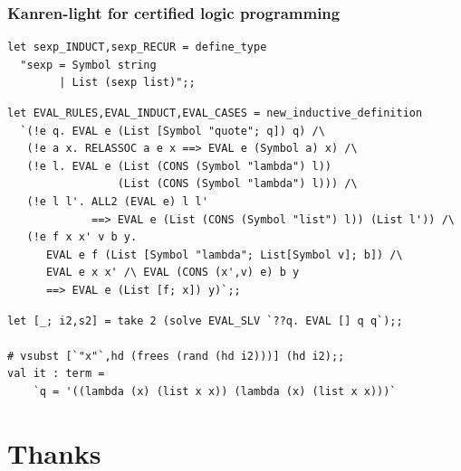 \documentclass[9pt]{beamer}
\begin{document}
\begin{frame}[fragile]
\frametitle{Kanren-light for certified logic programming}
\begin{verbatim}
let sexp_INDUCT,sexp_RECUR = define_type
  "sexp = Symbol string
        | List (sexp list)";;
\end{verbatim}
\vfill
\begin{verbatim}
let EVAL_RULES,EVAL_INDUCT,EVAL_CASES = new_inductive_definition
  `(!e q. EVAL e (List [Symbol "quote"; q]) q) /\
   (!e a x. RELASSOC a e x ==> EVAL e (Symbol a) x) /\
   (!e l. EVAL e (List (CONS (Symbol "lambda") l))
                 (List (CONS (Symbol "lambda") l))) /\
   (!e l l'. ALL2 (EVAL e) l l'
             ==> EVAL e (List (CONS (Symbol "list") l)) (List l')) /\
   (!e f x x' v b y.
      EVAL e f (List [Symbol "lambda"; List[Symbol v]; b]) /\
      EVAL e x x' /\ EVAL (CONS (x',v) e) b y
      ==> EVAL e (List [f; x]) y)`;;
\end{verbatim}
\vfill
\begin{verbatim}
let [_; i2,s2] = take 2 (solve EVAL_SLV `??q. EVAL [] q q`);;

# vsubst [`"x"`,hd (frees (rand (hd i2)))] (hd i2);;
val it : term = 
    `q = '((lambda (x) (list x x)) (lambda (x) (list x x)))`
\end{verbatim}
\end{frame}

\section{Thanks}

\end{document}
